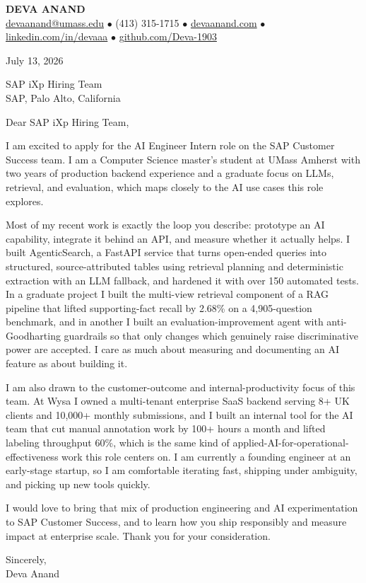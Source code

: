 \documentclass[letterpaper,11pt]{article}
\begin{document}
\begin{center}
    {\fontsize{18}{20}\selectfont\bfseries DEVA ANAND}\\ \vspace{3pt}
    {\small
    \href{mailto:devaanand@umass.edu}{devaanand@umass.edu}
    \enspace$\bullet$\enspace
    (413) 315-1715
    \enspace$\bullet$\enspace
    \href{https://devaanand.com}{devaanand.com}
    \enspace$\bullet$\enspace
    \href{https://linkedin.com/in/devaaa/}{linkedin.com/in/devaaa}
    \enspace$\bullet$\enspace
    \href{https://github.com/Deva-1903}{github.com/Deva-1903}}
\end{center}
\vspace{6pt}

July 13, 2026
\vspace{2pt}

SAP iXp Hiring Team \\
SAP, Palo Alto, California

\vspace{4pt}

Dear SAP iXp Hiring Team,

I am excited to apply for the AI Engineer Intern role on the SAP Customer Success team. I am a Computer Science master's student at UMass Amherst with two years of production backend experience and a graduate focus on LLMs, retrieval, and evaluation, which maps closely to the AI use cases this role explores.

Most of my recent work is exactly the loop you describe: prototype an AI capability, integrate it behind an API, and measure whether it actually helps. I built AgenticSearch, a FastAPI service that turns open-ended queries into structured, source-attributed tables using retrieval planning and deterministic extraction with an LLM fallback, and hardened it with over 150 automated tests. In a graduate project I built the multi-view retrieval component of a RAG pipeline that lifted supporting-fact recall by 2.68\% on a 4,905-question benchmark, and in another I built an evaluation-improvement agent with anti-Goodharting guardrails so that only changes which genuinely raise discriminative power are accepted. I care as much about measuring and documenting an AI feature as about building it.

I am also drawn to the customer-outcome and internal-productivity focus of this team. At Wysa I owned a multi-tenant enterprise SaaS backend serving 8+ UK clients and 10,000+ monthly submissions, and I built an internal tool for the AI team that cut manual annotation work by 100+ hours a month and lifted labeling throughput 60\%, which is the same kind of applied-AI-for-operational-effectiveness work this role centers on. I am currently a founding engineer at an early-stage startup, so I am comfortable iterating fast, shipping under ambiguity, and picking up new tools quickly.

I would love to bring that mix of production engineering and AI experimentation to SAP Customer Success, and to learn how you ship responsibly and measure impact at enterprise scale. Thank you for your consideration.

\vspace{6pt}

Sincerely, \\
Deva Anand
\end{document}
